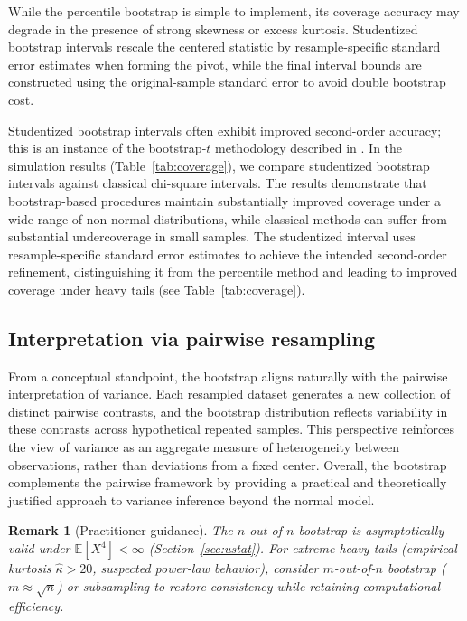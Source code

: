 \documentclass[12pt,a4paper]{article}
\newtheorem{remark}{Remark}
\begin{document}
While the percentile bootstrap is simple to implement, its coverage accuracy may degrade in the presence of strong skewness or excess kurtosis. Studentized bootstrap intervals rescale the centered statistic by resample-specific standard error estimates when forming the pivot, while the final interval bounds are constructed using the original-sample standard error to avoid double bootstrap cost.

Studentized bootstrap intervals often exhibit improved second-order accuracy; this is an instance of the bootstrap-$t$ methodology described in \citet{hall1992}. In the simulation results (Table~\ref{tab:coverage}), we compare studentized bootstrap intervals against classical chi-square intervals. The results demonstrate that bootstrap-based procedures maintain substantially improved coverage under a wide range of non-normal distributions, while classical methods can suffer from substantial undercoverage in small samples. The studentized interval uses resample-specific standard error estimates to achieve the intended second-order refinement, distinguishing it from the percentile method and leading to improved coverage under heavy tails (see Table~\ref{tab:coverage}).

\subsection{Interpretation via pairwise resampling}

From a conceptual standpoint, the bootstrap aligns naturally with the pairwise interpretation of variance. Each resampled dataset generates a new collection of distinct pairwise contrasts, and the bootstrap distribution reflects variability in these contrasts across hypothetical repeated samples. This perspective reinforces the view of variance as an aggregate measure of heterogeneity between observations, rather than deviations from a fixed center. Overall, the bootstrap complements the pairwise framework by providing a practical and theoretically justified approach to variance inference beyond the normal model.

\begin{remark}[Practitioner guidance]
The $n$-out-of-$n$ bootstrap is asymptotically valid under $\mathbb{E}[X^4] < \infty$ (Section~\ref{sec:ustat}). For extreme heavy tails (empirical kurtosis $\hat{\kappa} > 20$, suspected power-law behavior), consider $m$-out-of-$n$ bootstrap ($m \approx \sqrt{n}$) or subsampling to restore consistency while retaining computational efficiency.
\end{remark}
\end{document}
